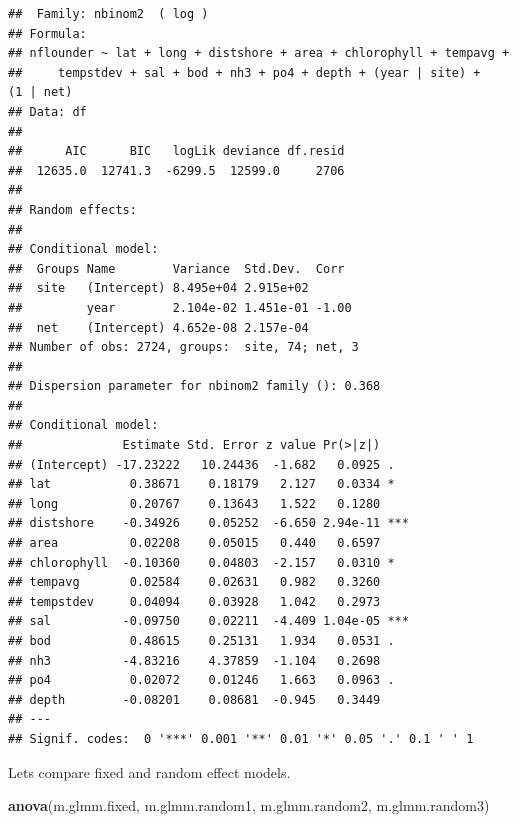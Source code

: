 \documentclass[
]{article}
\newenvironment{Shaded}{\begin{snugshade}}{\end{snugshade}}
\newcommand{\FunctionTok}[1]{\textcolor[rgb]{0.13,0.29,0.53}{\textbf{#1}}}
\newcommand{\NormalTok}[1]{#1}
\begin{document}
\begin{verbatim}
##  Family: nbinom2  ( log )
## Formula:          
## nflounder ~ lat + long + distshore + area + chlorophyll + tempavg +  
##     tempstdev + sal + bod + nh3 + po4 + depth + (year | site) +      (1 | net)
## Data: df
## 
##      AIC      BIC   logLik deviance df.resid 
##  12635.0  12741.3  -6299.5  12599.0     2706 
## 
## Random effects:
## 
## Conditional model:
##  Groups Name        Variance  Std.Dev.  Corr  
##  site   (Intercept) 8.495e+04 2.915e+02       
##         year        2.104e-02 1.451e-01 -1.00 
##  net    (Intercept) 4.652e-08 2.157e-04       
## Number of obs: 2724, groups:  site, 74; net, 3
## 
## Dispersion parameter for nbinom2 family (): 0.368 
## 
## Conditional model:
##              Estimate Std. Error z value Pr(>|z|)    
## (Intercept) -17.23222   10.24436  -1.682   0.0925 .  
## lat           0.38671    0.18179   2.127   0.0334 *  
## long          0.20767    0.13643   1.522   0.1280    
## distshore    -0.34926    0.05252  -6.650 2.94e-11 ***
## area          0.02208    0.05015   0.440   0.6597    
## chlorophyll  -0.10360    0.04803  -2.157   0.0310 *  
## tempavg       0.02584    0.02631   0.982   0.3260    
## tempstdev     0.04094    0.03928   1.042   0.2973    
## sal          -0.09750    0.02211  -4.409 1.04e-05 ***
## bod           0.48615    0.25131   1.934   0.0531 .  
## nh3          -4.83216    4.37859  -1.104   0.2698    
## po4           0.02072    0.01246   1.663   0.0963 .  
## depth        -0.08201    0.08681  -0.945   0.3449    
## ---
## Signif. codes:  0 '***' 0.001 '**' 0.01 '*' 0.05 '.' 0.1 ' ' 1
\end{verbatim}

Lets compare fixed and random effect models.

\begin{Shaded}
\begin{Highlighting}[]
\FunctionTok{anova}\NormalTok{(m.glmm.fixed, m.glmm.random1, m.glmm.random2, m.glmm.random3)}
\end{Highlighting}
\end{Shaded}
\end{document}
